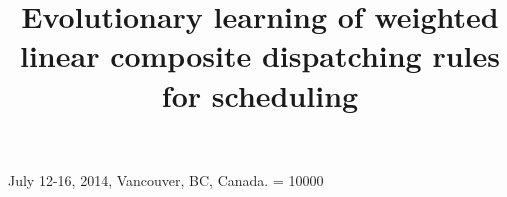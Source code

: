 \documentclass{acm_proc_article-sp}
\begin{document}
 {July 12-16, 2014, Vancouver, BC, Canada.}
\widowpenalty = 10000

\title{Evolutionary learning of weighted linear composite dispatching rules for scheduling}
%
%
%
%
%
\end{document}

